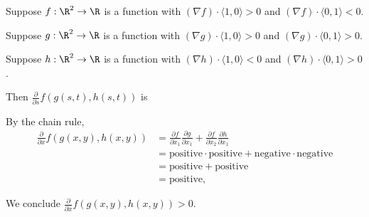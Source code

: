 \documentclass{ximera}
\author{Jim Fowler}
\begin{document}
\begin{exercise}
  
Suppose  $f : \R^2 \to \R$  is a function with 
$(\nabla f) \cdot \langle 1, 0 \rangle > 0$  and
$(\nabla f) \cdot \langle 0, 1 \rangle < 0$.

Suppose  $g : \R^2 \to \R$  is a function with  
$(\nabla g) \cdot \langle 1, 0 \rangle > 0$  and
$(\nabla g) \cdot \langle 0, 1 \rangle > 0$.


Suppose $h : \R^2 \to \R$  is a function with      
$(\nabla h) \cdot \langle 1, 0 \rangle < 0$ and
$(\nabla h) \cdot \langle 0, 1 \rangle > 0$.

Then
$\displaystyle\frac{\partial}{\partial s} f(g(s,t),h(s,t))$ is
\begin{multipleChoice}
\end{multipleChoice}

\begin{hint}
By the chain rule,
\begin{align*}
\frac{\partial}{\partial x} f(g(x,y),h(x,y))
&= \frac{\partial f}{\partial x_1} \frac{\partial g}{\partial x_1} + \frac{\partial f}{\partial x_2} \frac{\partial h}{\partial x_1} \\
&= \mbox{positive} \cdot \mbox{positive} + \mbox{negative} \cdot \mbox{negative} \\
&= \mbox{positive} + \mbox{positive} \\
&= \mbox{positive},
\end{align*}
\end{hint}
\begin{hint}
We conclude $\displaystyle\frac{\partial}{\partial x} f(g(x,y),h(x,y)) > 0$.
\end{hint}

\end{exercise}
\end{document}
